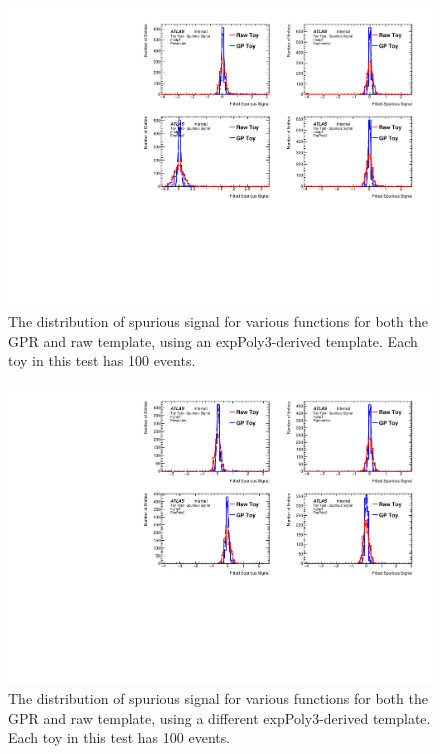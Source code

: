 \begin{figure} 
\begin{center}
  \includegraphics[width=\textwidth]{figures/background/gpr/validation/nominal/ToyTest_FitSigVals_medpT_100_noSig}   
\caption{The distribution of spurious signal for various functions for both the GPR and raw template, using an expPoly3-derived template. Each toy in this test has 100 events.}
\label{fig:medpt_100_noSig}
\end{center}
\end{figure}

\begin{figure} 
\begin{center}
  \includegraphics[width=\textwidth]{figures/background/gpr/validation/nominal/ToyTest_FitSigVals_highpT_100_noSig}   
\caption{The distribution of spurious signal for various functions for both the GPR and raw template, using a different expPoly3-derived template. Each toy in this test has 100 events.}
\label{fig:highpt_100_noSig}
\end{center}
\end{figure}

